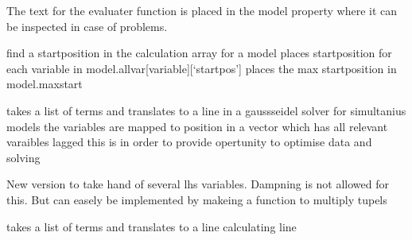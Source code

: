 \documentclass[letterpaper,10pt,english]{sphinxmanual}
\begin{document}
\begin{fulllineitems}
\begin{fulllineitems}
\sphinxAtStartPar
The text for the evaluater function is placed in the model property 
where it can be inspected
in case of problems.

\end{fulllineitems}


\begin{fulllineitems}
\label{\detokenize{core/modelclass:modelclass.BaseModel.findpos}}
\pysigstartsignatures
{}
\pysigstopsignatures
\sphinxAtStartPar
find a startposition in the calculation array for a model
places startposition for each variable in model.allvar{[}variable{]}{[}‘startpos’{]}
places the max startposition in model.maxstart

\end{fulllineitems}


\begin{fulllineitems}
\label{\detokenize{core/modelclass:modelclass.BaseModel.make_gaussline}}
\pysigstartsignatures
{}
\pysigstopsignatures
\sphinxAtStartPar
takes a list of terms and translates to a line in a gauss\sphinxhyphen{}seidel solver for
simultanius models
the variables are mapped to position in a vector which has all relevant varaibles lagged
this is in order to provide opertunity to optimise data and solving

\sphinxAtStartPar
New version to take hand of several lhs variables. Dampning is not allowed for
this. But can easely be implemented by makeing a function to multiply tupels

\end{fulllineitems}


\begin{fulllineitems}
\label{\detokenize{core/modelclass:modelclass.BaseModel.make_resline}}
\pysigstartsignatures
{}
\pysigstopsignatures
\sphinxAtStartPar
takes a list of terms and translates to a line calculating line


\end{fulllineitems}
\end{fulllineitems}
\end{document}

